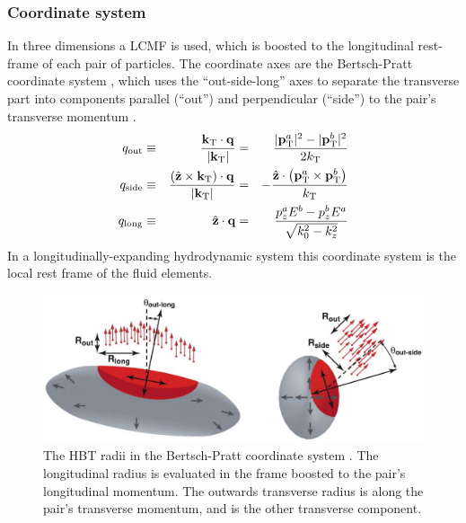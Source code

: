 
\subsubsection{Coordinate system}
\label{subsubsec:coordinate}
In three dimensions a \ac{LCMF} is used, which is boosted to the longitudinal rest-frame of each pair of particles.
The coordinate axes are the Bertsch-Pratt coordinate system \cite{Pratt:1986cc,Bertsch:1989vn,Csorgo:1989kq}, which uses the ``out-side-long'' axes to separate the transverse part into components parallel (``out'') and perpendicular (``side'') to the pair's transverse momentum \kt.
\begin{align}
q_{\mathrm{out}} &\equiv& \frac{\mathbf{k}_{\mathrm{T}} \cdot \mathbf{q}}{\left| \mathbf{k}_{\mathrm{T}} \right|}
&=& \frac{|\mathbf{p}^a_{\mathrm{T}}|^2 - |\mathbf{p}^b_{\mathrm{T}}|^2}{2 k_\mathrm{T}}\\
q_{\mathrm{side}} &\equiv& \frac{(\hat{\mathbf{z}} \times \mathbf{k}_{\mathrm{T}}) \cdot \mathbf{q}}{\left| \mathbf{k}_{\mathrm{T}} \right|} &=& - \frac{\hat{\mathbf{z}} \cdot \left(\mathbf{p}^a_{\mathrm{T}} \times \mathbf{p}^b_{\mathrm{T}}\right)}{k_\mathrm{T}}\\
q_{\mathrm{long}} &\equiv& \hat{\mathbf{z}} \cdot \mathbf{q} &=& \frac{p^a_{z}E^{b} - p^b_{z}E^{a}}{\sqrt{k_{0}^2 - k_{z}^2}}
\end{align}
In a longitudinally-expanding hydrodynamic system this coordinate system is the local rest frame of the fluid elements.

\begin{figure}[t]
  \includegraphics{hbt_radii_outsidelong.png}
  \caption{The HBT radii in the Bertsch-Pratt coordinate system \cite{Lisa:2005dd}. The longitudinal radius \Rlong is evaluated in the frame boosted to the pair's longitudinal momentum. The outwards transverse radius \Rout is along the pair's transverse momentum, and \Rside is the other transverse component.}
  \label{fig:hbt_outsidelong}
\end{figure}

